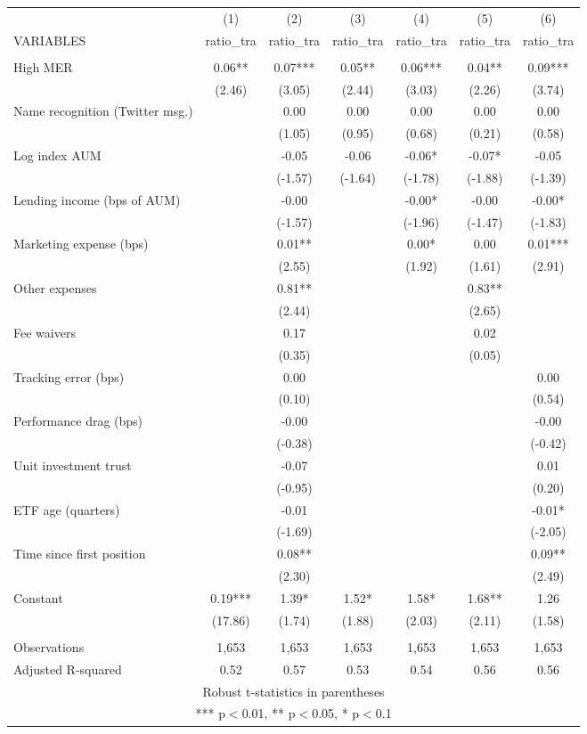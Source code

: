 \documentclass[]{article}
\begin{document}
\begin{tabular}{lcccccc} \hline
 & (1) & (2) & (3) & (4) & (5) & (6) \\
VARIABLES & ratio\_tra & ratio\_tra & ratio\_tra & ratio\_tra & ratio\_tra & ratio\_tra \\ \hline
 &  &  &  &  &  &  \\
High MER & 0.06** & 0.07*** & 0.05** & 0.06*** & 0.04** & 0.09*** \\
 & (2.46) & (3.05) & (2.44) & (3.03) & (2.26) & (3.74) \\
Name recognition (Twitter msg.) &  & 0.00 & 0.00 & 0.00 & 0.00 & 0.00 \\
 &  & (1.05) & (0.95) & (0.68) & (0.21) & (0.58) \\
Log index AUM &  & -0.05 & -0.06 & -0.06* & -0.07* & -0.05 \\
 &  & (-1.57) & (-1.64) & (-1.78) & (-1.88) & (-1.39) \\
Lending income (bps of AUM) &  & -0.00 &  & -0.00* & -0.00 & -0.00* \\
 &  & (-1.57) &  & (-1.96) & (-1.47) & (-1.83) \\
Marketing expense (bps) &  & 0.01** &  & 0.00* & 0.00 & 0.01*** \\
 &  & (2.55) &  & (1.92) & (1.61) & (2.91) \\
Other expenses &  & 0.81** &  &  & 0.83** &  \\
 &  & (2.44) &  &  & (2.65) &  \\
Fee waivers &  & 0.17 &  &  & 0.02 &  \\
 &  & (0.35) &  &  & (0.05) &  \\
Tracking error (bps) &  & 0.00 &  &  &  & 0.00 \\
 &  & (0.10) &  &  &  & (0.54) \\
Performance drag (bps) &  & -0.00 &  &  &  & -0.00 \\
 &  & (-0.38) &  &  &  & (-0.42) \\
Unit investment trust &  & -0.07 &  &  &  & 0.01 \\
 &  & (-0.95) &  &  &  & (0.20) \\
ETF age (quarters) &  & -0.01 &  &  &  & -0.01* \\
 &  & (-1.69) &  &  &  & (-2.05) \\
Time since first position &  & 0.08** &  &  &  & 0.09** \\
 &  & (2.30) &  &  &  & (2.49) \\
Constant & 0.19*** & 1.39* & 1.52* & 1.58* & 1.68** & 1.26 \\
 & (17.86) & (1.74) & (1.88) & (2.03) & (2.11) & (1.58) \\
 &  &  &  &  &  &  \\
Observations & 1,653 & 1,653 & 1,653 & 1,653 & 1,653 & 1,653 \\
 Adjusted R-squared & 0.52 & 0.57 & 0.53 & 0.54 & 0.56 & 0.56 \\ \hline
\multicolumn{7}{c}{ Robust t-statistics in parentheses} \\
\multicolumn{7}{c}{ *** p$<$0.01, ** p$<$0.05, * p$<$0.1} \\
\end{tabular}
\end{document}
